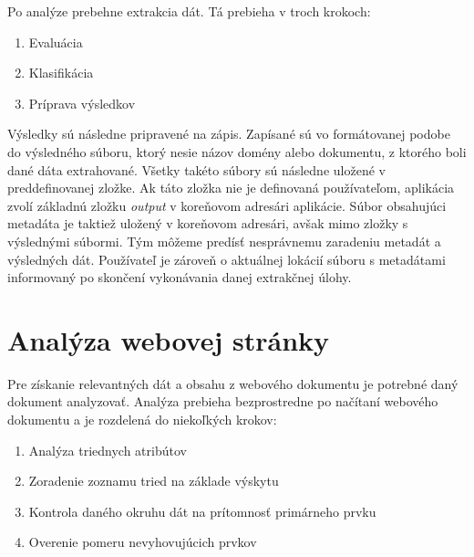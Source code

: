  Po analýze prebehne extrakcia dát. Tá prebieha v troch krokoch:
 
 \begin{enumerate}
     \item Evaluácia
     \item Klasifikácia
     \item Príprava výsledkov
 \end{enumerate}
 
 \bigskip
 
 Výsledky sú následne pripravené na zápis. Zapísané sú vo formátovanej podobe do výsledného súboru, ktorý nesie názov domény alebo dokumentu, z ktorého boli dané dáta extrahované. Všetky takéto súbory sú následne uložené v preddefinovanej zložke. Ak táto zložka nie je definovaná používateľom, aplikácia zvolí základnú zložku \textit{output} v koreňovom adresári aplikácie. Súbor obsahujúci metadáta je taktiež uložený v koreňovom adresári, avšak mimo zložky s výslednými súbormi. Tým môžeme predísť nesprávnemu zaradeniu metadát a výsledných dát. Používateľ je zároveň o aktuálnej lokácií súboru s metadátami informovaný po skončení vykonávania danej extrakčnej úlohy.
 
 \newpage
 \section{Analýza webovej stránky}
 
 Pre získanie relevantných dát a obsahu z webového dokumentu je potrebné daný dokument analyzovať. Analýza prebieha bezprostredne po načítaní webového dokumentu a je rozdelená do niekoľkých krokov:
 
 \begin{enumerate}
     \item Analýza triednych atribútov
     \item Zoradenie zoznamu tried na základe výskytu
     \item Kontrola daného okruhu dát na prítomnosť primárneho prvku
     \item Overenie pomeru nevyhovujúcich prvkov
 \end{enumerate}
 
 \bigskip
 
